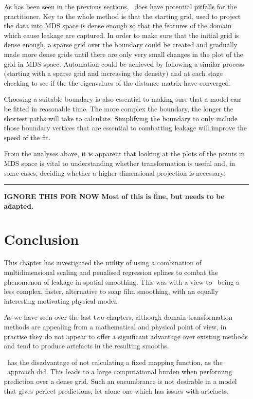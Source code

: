 {As has been seen in the previous sections, \mdsap\ does have potential pitfalls for the practitioner. Key to the whole method is that the starting grid, used to project the data into MDS space is dense enough so that the features of the domain which cause leakage are captured. In order to make sure that the initial grid is dense enough, a sparse grid over the boundary could be created and gradually made more dense grids until there are only very small changes in the plot of the grid in MDS space. Automation could be achieved by following a similar process (starting with a sparse grid and increasing the density) and at each stage checking to see if the the eigenvalues of the distance matrix have converged.

Choosing a suitable boundary is also essential to making sure that a model can be fitted in reasonable time. The more complex the boundary, the longer the shortest paths will take to calculate. Simplifying the boundary to only include those boundary vertices that are essential to combatting leakage will improve the speed of the fit.

From the analyses above, it is apparent that looking at the plots of the points in MDS space is vital to understanding whether transformation is useful and, in some cases, deciding whether a higher-dimensional projection is necessary.


\rule{6in}{1pt}

\textbf{IGNORE THIS FOR NOW}
\textbf{Most of this is fine, but needs to be adapted.}

\section{Conclusion}
\label{mds-conc}

This chapter has investigated the utility of using a combination of multidimensional scaling and penalised regression splines to combat the phenomenon of leakage in spatial smoothing. This was with a view to \mdsap\ being a less complex, faster, alternative to soap film smoothing, with an equally interesting motivating physical model.

As we have seen over the last two chapters, although domain transformation methods are appealing from a mathematical and physical point of view, in practise they do not appear to offer a significant advantage over existing methods and tend to produce artefacts in the resulting smooths.

\mdsap\ has the disadvantage of not calculating a fixed mapping function, as the \sch\ approach did. This leads to a large computational burden when performing prediction over a dense grid. Such an encumbrance is not desirable in a model that gives perfect predictions, let-alone one which has issues with artefacts.

}
